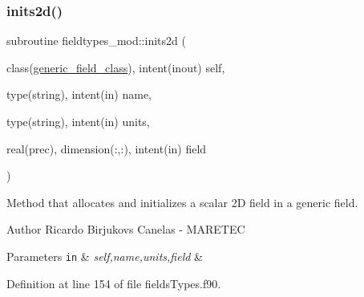 \subsubsection{\texorpdfstring{inits2d()}{inits2d()}}
{\footnotesize\ttfamily subroutine fieldtypes\+\_\+mod\+::inits2d (\begin{DoxyParamCaption}\item[{class(\mbox{\hyperlink{structfieldtypes__mod_1_1generic__field__class}{generic\+\_\+field\+\_\+class}}), intent(inout)}]{self,  }\item[{type(string), intent(in)}]{name,  }\item[{type(string), intent(in)}]{units,  }\item[{real(prec), dimension(\+:,\+:), intent(in)}]{field }\end{DoxyParamCaption})\hspace{0.3cm}{\ttfamily [private]}}



Method that allocates and initializes a scalar 2D field in a generic field. 

\begin{DoxyAuthor}{Author}
Ricardo Birjukovs Canelas -\/ M\+A\+R\+E\+T\+EC 
\end{DoxyAuthor}

\begin{DoxyParams}[1]{Parameters}
\mbox{\tt in}  & {\em self,name,units,field} & \\
\hline
\end{DoxyParams}


Definition at line 154 of file fields\+Types.\+f90.


